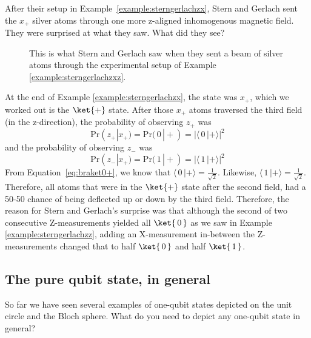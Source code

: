 \documentclass{article}
\theoremstyle{definition}
\newcommand{\abs}[1]{{\big\vert} #1 {\big\vert}}
\newcommand{\kz}[1]{\ket{\,#1\,}}
\newcommand{\kx}[1]{\ket{#1}}
\begin{document}
\newpage
\begin{example} \label{example:sterngerlachzxz}
	After their setup in Example~\ref{example:sterngerlachzx}, Stern and Gerlach sent the $x_+$ silver atoms through one more z-aligned inhomogenous magnetic field.  They were surprised at what they saw.  What did they see?
	
	\begin{figure}[H]
		\caption{This is what Stern and Gerlach saw when they sent a beam of silver atoms through the experimental setup of Example \ref{example:sterngerlachzxz}.}
	\end{figure}

	\textnormal{At the end of Example \ref{example:sterngerlachzx}, the state was $x_+$, which we worked out is the $\kx+$ state.  After those $x_+$ atoms traversed the third field (in the z-direction), the probability of observing $z_+$ was
	\begin{equation}
		\text{Pr}(z_+|x_+) = \text{Pr}(\,0\,|+) = \abs{\langle\,0\,|+\rangle}^2
	\end{equation}
	and the probability of observing $z_-$ was
	\begin{equation}
		\text{Pr}(z_-|x_+) = \text{Pr}(\,1\,|+) = \abs{\langle\,1\,|+\rangle}^2
	\end{equation}
	From Equation~\ref{eq:braket0+}, we know that $\langle\,0\,|+\rangle = \frac{1}{\sqrt{2}}$.  Likewise, $\langle\,1\,|+\rangle = \frac{1}{\sqrt{2}}$.  Therefore, all atoms that were in the $\kx+$ state after the second field, had a 50-50 chance of being deflected up or down by the third field.  Therefore, the reason for Stern and Gerlach's surprise was that although the second of two consecutive Z-measurements yielded all $\kz0$ as we saw in Example \ref{example:sterngerlachzz}, adding an X-measurement in-between the Z-measurements changed that to half $\kz0$ and half $\kz1$.}
\end{example}

\newpage
\subsection{The pure qubit state, in general}
So far we have seen several examples of one-qubit states depicted on the unit circle and the Bloch sphere.  What do you need to depict any one-qubit state in general?
\end{document}
